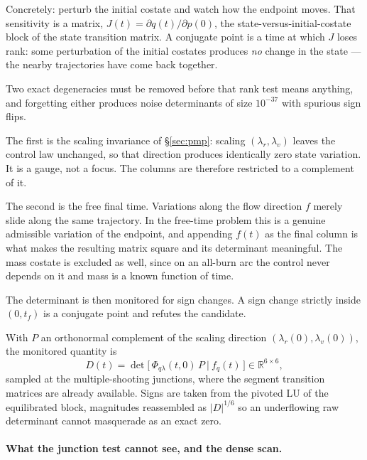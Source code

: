\documentclass[11pt]{article}
\newcommand{\lv}{\lambda_v}\newcommand{\lr}{\lambda_r}\newcommand{\lm}{\lambda_m}
\newcommand{\tf}{t_f}\newcommand{\R}{\mathbb{R}}
\begin{document}
\begin{intu}
Concretely: perturb the initial costate and watch how the endpoint moves. That
sensitivity is a matrix, $J(t) = \partial q(t) / \partial p(0)$, the
state-versus-initial-costate block of the state transition matrix. A conjugate
point is a time at which $J$ loses rank: some perturbation of the initial
costates produces \emph{no} change in the state --- the nearby trajectories have
come back together.

Two exact degeneracies must be removed before that rank test means anything,
and forgetting either produces noise determinants of size $10^{-37}$ with
spurious sign flips.

The first is the scaling invariance of \S\ref{sec:pmp}: scaling
$(\lr, \lv)$ leaves the control law unchanged, so that direction produces
identically zero state variation. It is a gauge, not a focus. The columns are
therefore restricted to a complement of it.

The second is the free final time. Variations along the flow direction $f$
merely slide along the same trajectory. In the free-time problem this is a
genuine admissible variation of the endpoint, and appending $f(t)$ as the final
column is what makes the resulting matrix square and its determinant
meaningful. The mass costate is excluded as well, since on an all-burn arc the
control never depends on it and mass is a known function of time.

The determinant is then monitored for sign changes. A sign change strictly
inside $(0, \tf)$ is a conjugate point and refutes the candidate.
\end{intu}

\begin{rig}
With $P$ an orthonormal complement of the scaling direction
$(\lr(0), \lv(0))$, the monitored quantity is
\begin{equation}\label{eq:jacobi}
D(t) = \det \big[\, \Phi_{q\lambda}(t, 0)\, P \ \big|\ f_q(t) \,\big] \in \R^{6\times6},
\end{equation}
sampled at the multiple-shooting junctions, where the segment transition
matrices are already available. Signs are taken from the pivoted LU of the
equilibrated block, magnitudes reassembled as $|D|^{1/6}$ so an underflowing
raw determinant cannot masquerade as an exact zero.
\end{rig}

\paragraph{What the junction test cannot see, and the dense scan.}
\end{document}
